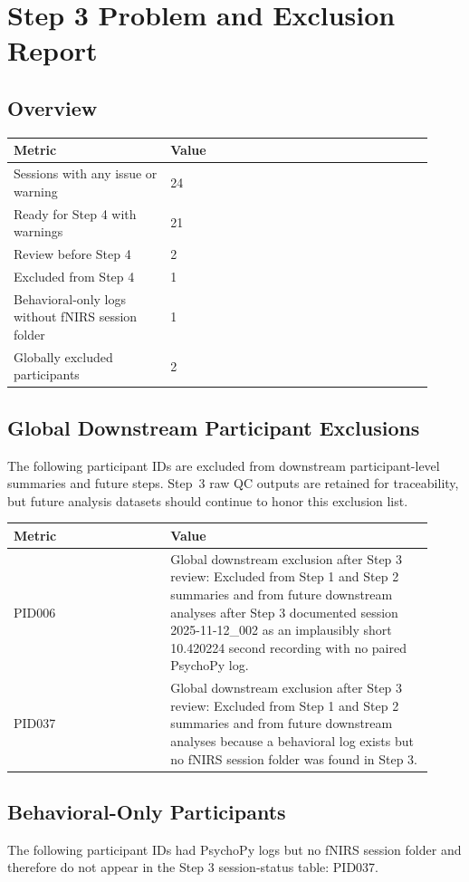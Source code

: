 \documentclass[11pt]{article}
\begin{document}
\section*{Step 3 Problem and Exclusion Report}
\subsection*{Overview}
\begin{tabular}{p{0.34\linewidth}p{0.58\linewidth}}
\toprule
Metric & Value\\
\midrule
Sessions with any issue or warning & 24\\
Ready for Step 4 with warnings & 21\\
Review before Step 4 & 2\\
Excluded from Step 4 & 1\\
Behavioral-only logs without fNIRS session folder & 1\\
Globally excluded participants & 2\\
\bottomrule
\end{tabular}
\subsection*{Global Downstream Participant Exclusions}
The following participant IDs are excluded from downstream participant-level summaries and future steps. Step~3 raw QC outputs are retained for traceability, but future analysis datasets should continue to honor this exclusion list.
\begin{tabular}{p{0.34\linewidth}p{0.58\linewidth}}
\toprule
Metric & Value\\
\midrule
PID006 & Global downstream exclusion after Step 3 review: Excluded from Step 1 and Step 2 summaries and from future downstream analyses after Step 3 documented session 2025-11-12\_002 as an implausibly short 10.420224 second recording with no paired PsychoPy log.\\
PID037 & Global downstream exclusion after Step 3 review: Excluded from Step 1 and Step 2 summaries and from future downstream analyses because a behavioral log exists but no fNIRS session folder was found in Step 3.\\
\bottomrule
\end{tabular}
\subsection*{Behavioral-Only Participants}
The following participant IDs had PsychoPy logs but no fNIRS session folder and therefore do not appear in the Step 3 session-status table: PID037.
\end{document}
